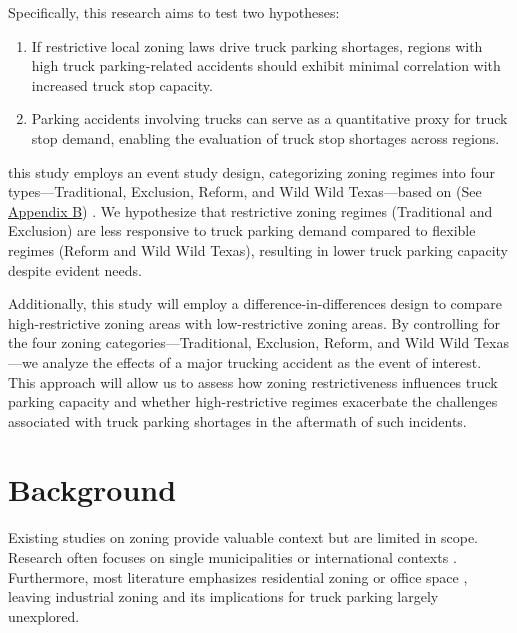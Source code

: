 \documentclass[
  12pt]{article}
\begin{document}
Specifically, this research aims to test two hypotheses:

\begin{enumerate}
\def\labelenumi{\arabic{enumi}.}
\item
  If restrictive local zoning laws drive truck parking shortages,
  regions with high truck parking-related accidents should exhibit
  minimal correlation with increased truck stop capacity.
\item
  Parking accidents involving trucks can serve as a quantitative proxy
  for truck stop demand, enabling the evaluation of truck stop shortages
  across regions.
\end{enumerate}

this study employs an event study design, categorizing zoning regimes
into four types---Traditional, Exclusion, Reform, and Wild Wild
Texas---based on \citep{puentesTraditionalReformedReview2006} (See
\label{sec:appendix-b}\hyperref[sec-b.-map-of-zoning-categories]{Appendi}\hyperref[sec:appendix-b]{x
B}) . We hypothesize that restrictive zoning regimes (Traditional and
Exclusion) are less responsive to truck parking demand compared to
flexible regimes (Reform and Wild Wild Texas), resulting in lower truck
parking capacity despite evident needs.

Additionally, this study will employ a difference-in-differences design
to compare high-restrictive zoning areas with low-restrictive zoning
areas. By controlling for the four zoning categories---Traditional,
Exclusion, Reform, and Wild Wild Texas---we analyze the effects of a
major trucking accident as the event of interest. This approach will
allow us to assess how zoning restrictiveness influences truck parking
capacity and whether high-restrictive regimes exacerbate the challenges
associated with truck parking shortages in the aftermath of such
incidents.

\section{Background}\label{background}

Existing studies on zoning provide valuable context but are limited in
scope. Research often focuses on single municipalities
\citep{shertzerRaceEthnicityDiscriminatory2016, glaeserCausesConsequencesLand2009}
or international contexts \citep{anagolEstimatingEconomicValue2021}.
Furthermore, most literature emphasizes residential zoning
\citep{lensStrictLandUse2016, huangResidentialLandUse2012}or office
space \citep{cheshireOfficeSpaceSupply2008}, leaving industrial zoning
and its implications for truck parking largely unexplored.
\end{document}
